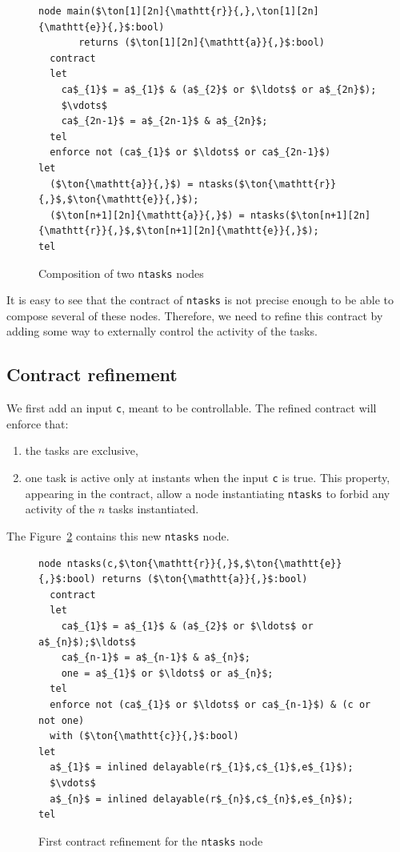 \documentclass[a4paper]{article}
\begin{document}
\begin{figure}[htb]
\begin{lstlisting}
node main($\ton[1][2n]{\mathtt{r}}{,},\ton[1][2n]{\mathtt{e}}{,}$:bool)
       returns ($\ton[1][2n]{\mathtt{a}}{,}$:bool)
  contract
  let
    ca$_{1}$ = a$_{1}$ & (a$_{2}$ or $\ldots$ or a$_{2n}$);
    $\vdots$
    ca$_{2n-1}$ = a$_{2n-1}$ & a$_{2n}$;
  tel
  enforce not (ca$_{1}$ or $\ldots$ or ca$_{2n-1}$)
let
  ($\ton{\mathtt{a}}{,}$) = ntasks($\ton{\mathtt{r}}{,}$,$\ton{\mathtt{e}}{,}$); 
  ($\ton[n+1][2n]{\mathtt{a}}{,}$) = ntasks($\ton[n+1][2n]{\mathtt{r}}{,}$,$\ton[n+1][2n]{\mathtt{e}}{,}$); 
tel
\end{lstlisting}
\caption{Composition of two \texttt{ntasks} nodes}
\label{fig:2n-del-task}
\end{figure}

It is easy to see that the contract of \texttt{ntasks} is not precise enough to
be able to compose several of these nodes. Therefore, we need to refine this
contract by adding some way to externally control the activity of the tasks.

\subsection{Contract refinement}
\label{sec:contract-refinement}

We first add an input \texttt{c}, meant to be controllable. The refined contract
will enforce that:
\begin{enumerate}
\item the tasks are exclusive,
\item one task is active only at instants when the input \texttt{c} is
  true. This property, appearing in the contract, allow a node instantiating
  \texttt{ntasks} to forbid any activity of the $n$ tasks instantiated.
\end{enumerate}
The Figure~\ref{fig:n-del-task-2} contains this new \texttt{ntasks} node.

\begin{figure}[htb]
\begin{lstlisting}
node ntasks(c,$\ton{\mathtt{r}}{,}$,$\ton{\mathtt{e}}{,}$:bool) returns ($\ton{\mathtt{a}}{,}$:bool)
  contract
  let
    ca$_{1}$ = a$_{1}$ & (a$_{2}$ or $\ldots$ or a$_{n}$);$\ldots$
    ca$_{n-1}$ = a$_{n-1}$ & a$_{n}$;
    one = a$_{1}$ or $\ldots$ or a$_{n}$;
  tel
  enforce not (ca$_{1}$ or $\ldots$ or ca$_{n-1}$) & (c or not one)
  with ($\ton{\mathtt{c}}{,}$:bool)
let
  a$_{1}$ = inlined delayable(r$_{1}$,c$_{1}$,e$_{1}$); 
  $\vdots$
  a$_{n}$ = inlined delayable(r$_{n}$,c$_{n}$,e$_{n}$); 
tel
\end{lstlisting}
\caption{First contract refinement for the \texttt{ntasks} node}
\label{fig:n-del-task-2}
\end{figure}
\end{document}
